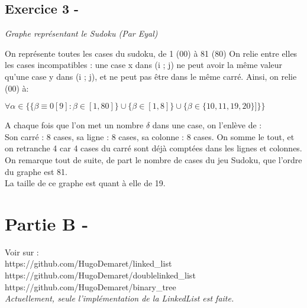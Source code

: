 \documentclass{article}
\begin{document}
\subsection*{Exercice 3 -}
\textit{Graphe représentant le Sudoku (Par Eyal)}
\begin{center}
\end{center}
\textsf{On représente toutes les cases du sudoku, de 1 (00) à 81 (80)}
\textsf{On relie entre elles les cases incompatibles : une case x dans (i ; j) ne peut avoir la même valeur qu'une case y dans (i ; j), et ne peut pas être dans le même carré.}
\textsf{Ainsi, on relie (00) à:}
\begin{center}
	$
		\forall \alpha \in \{\{\beta \equiv 0 [9] : \beta \in [1,80] \}\cup \{\beta \in [1,8]\} \cup \{\beta \in \{10,11,19,20\}]\}\}
	$
\end{center}
\textsf{A chaque fois que l'on met un nombre $\delta$ dans une case, on l'enlève de :}\\
\textsf{Son carré : 8 cases, sa ligne : 8 cases, sa colonne : 8 cases.}
\textsf{On somme le tout, et on retranche 4 car 4 cases du carré sont déjà comptées dans les lignes et colonnes.}
\textsf{On remarque tout de suite, de part le nombre de cases du jeu Sudoku, que l'ordre du graphe est 81.}\\
\textsf{La taille de ce graphe est quant à elle de 19.}
\section*{Partie B -}
Voir sur :\\
	https://github.com/HugoDemaret/linked\_list\\
	https://github.com/HugoDemaret/doublelinked\_list\\
	https://github.com/HugoDemaret/binary\_tree\\
	\textit{Actuellement, seule l'implémentation de la LinkedList est faite.}
\end{document}
